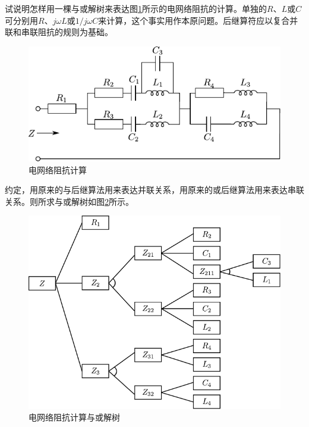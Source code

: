 \begin{question}
试说明怎样用一棵与或解树来表达图\ref{Fig:elec}所示的电网络阻抗的计算。单独的$R$、$L$或$C$可分别用$R$、$j\omega L$或$1/j\omega C$来计算，这个事实用作本原问题。后继算符应以复合并联和串联阻抗的规则为基础。
	\begin{figure}[h]
		\centering
		\includegraphics{figures/ques-2.4.pdf}
		\caption{电网络阻抗计算} \label{Fig:elec}
	\end{figure}
\end{question}
\begin{solution}
约定，用原来的与后继算法用来表达并联关系，用原来的或后继算法用来表达串联关系。则所求与或解树如图\ref{Fig:and-or-tree-for-elec}所示。
	\begin{figure}[h]
		\centering
		\includegraphics{figures/ans-2.4.pdf}
		\caption{电网络阻抗计算与或解树} \label{Fig:and-or-tree-for-elec}
	\end{figure}
\end{solution}

